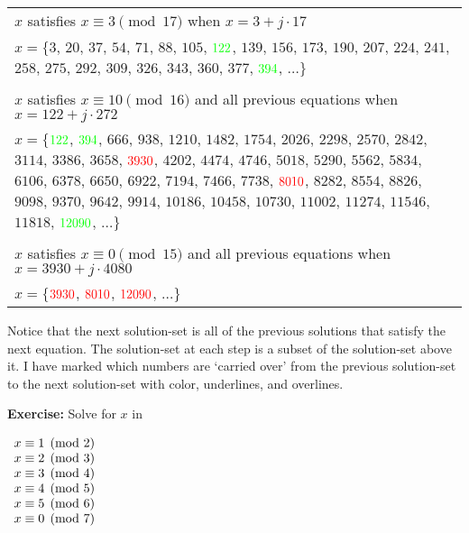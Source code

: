 \begin{longtable}[t]{p{7in}}
\(x\) satisfies \(x \equiv 3 \pmod {17}\) when \(x = 3 + j \cdot 17\)\\
\(x = \{\)\(3\), \(20\), \(37\), \(54\), \(71\), \(88\), \(105\), \(\color{green}122\), \(139\), \(156\), \(173\), \(190\), \(207\), \(224\), \(241\), \(258\), \(275\), \(292\), \(309\), \(326\), \(343\), \(360\), \(377\), \(\color{green} 394\), \(\dots\}\) \\
\\ \(x\) satisfies \(x \equiv 10 \pmod {16}\) and all previous equations
when \(x = 122 + j \cdot 272\) \\
\(x = \{\)\(\color{green}122\), \(\color{green}394\), \(666\), \(938\), \(1210\), \(1482\), \(1754\), \(2026\), \(2298\), \(2570\), \(2842\), \(3114\), \(3386\), \(3658\), \(\color{red}3930\), \(4202\), \(4474\), \(4746\), \(5018\), \(5290\), \(5562\), \(5834\), \(6106\), \(6378\), \(6650\), \(6922\), \(7194\), \(7466\), \(7738\), \(\color{red}8010\), \(8282\), \(8554\), \(8826\), \(9098\), \(9370\), \(9642\), \(9914\), \(10186\), \(10458\), \(10730\), \(11002\), \(11274\), \(11546\), \(11818\), \(\color{green}12090\), \(\dots\}\) \\
\\ \(x\) satisfies \(x \equiv 0 \pmod {15}\) and all previous equations when \(x = 3930 + j \cdot 4080\) \\
\(x = \{\)\(\color{red}3930\), \(\color{red}8010\), \(\color{red}12090\), \(\dots\}\) \\
\end{longtable}

Notice that the next solution-set is all of the previous solutions that satisfy the next equation. The solution-set at each step is a subset of the solution-set above it. I have marked which numbers are `carried over' from the previous solution-set to the next solution-set with color,  underlines, and overlines.

\item \textbf{Exercise:} Solve for \(x\) in

\(
\begin{array}[t]{l}
x \equiv 1 \pmod 2 \\
x \equiv 2 \pmod 3 \\
x \equiv 3 \pmod 4 \\
x \equiv 4 \pmod 5 \\
x \equiv 5 \pmod 6 \\
x \equiv 0 \pmod 7 \\
\end{array}
\)

